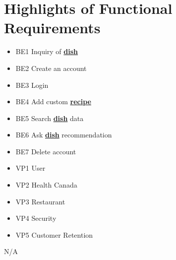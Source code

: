 \documentclass[]{article}
\begin{document}

\section{Highlights of Functional Requirements}
\label{sec:functional_requirements}

\begin{itemize}
	\item BE1 Inquiry of \hyperref[Dish]{\textbf{dish}}
	\item BE2 Create an account
	\item BE3 Login
	\item BE4 Add custom \hyperref[Recipe]{\textbf{recipe}}
	\item BE5 Search \hyperref[Dish]{\textbf{dish}} data
	\item BE6 Ask \hyperref[Dish]{\textbf{dish}} recommendation
	\item BE7 Delete account
\end{itemize}

\begin{itemize}
	\item VP1 User
	\item VP2 Health Canada
	\item VP3 Restaurant
	\item VP4 Security
	\item VP5 Customer Retention
\end{itemize}

 N/A \\
\end{document}
